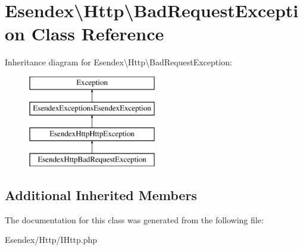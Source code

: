 \section{Esendex\textbackslash{}Http\textbackslash{}Bad\-Request\-Exception Class Reference}
\label{class_esendex_1_1_http_1_1_bad_request_exception}
Inheritance diagram for Esendex\textbackslash{}Http\textbackslash{}Bad\-Request\-Exception\-:\begin{figure}[H]
\begin{center}
\leavevmode
\includegraphics[height=4.000000cm]{class_esendex_1_1_http_1_1_bad_request_exception}
\end{center}
\end{figure}
\subsection*{Additional Inherited Members}


The documentation for this class was generated from the following file\-:\begin{DoxyCompactItemize}
\item 
Esendex/\-Http/I\-Http.\-php\end{DoxyCompactItemize}
